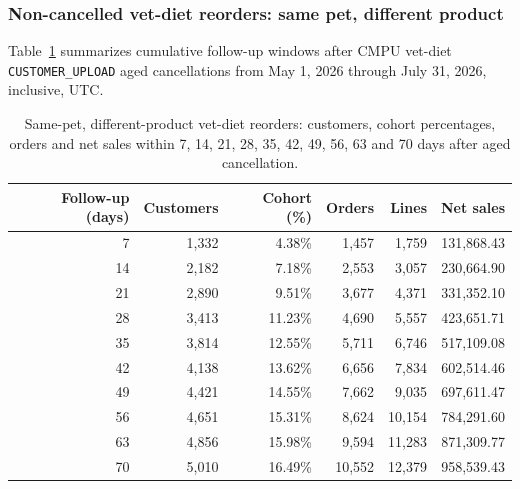 \clearpage
\subsubsection{Non-cancelled vet-diet reorders: same pet, different product}
Table~\ref{tab:financial-opportunity-reorder-same-pet-different-part} summarizes cumulative
follow-up windows after CMPU vet-diet \texttt{CUSTOMER\_UPLOAD} aged cancellations
from May 1, 2026 through July 31, 2026, inclusive, UTC.

\begin{table}[!htbp]
\centering
\caption{Same-pet, different-product vet-diet reorders: customers, cohort percentages, orders and net sales within 7, 14, 21, 28, 35, 42, 49, 56, 63 and 70 days after aged cancellation.}
\label{tab:financial-opportunity-reorder-same-pet-different-part}
\begin{tabular}{@{}rrrrrr@{}}
\toprule
Follow-up (days) & Customers & Cohort (\%) & Orders & Lines & Net sales \\
\midrule
7 & 1,332 & 4.38\% & 1,457 & 1,759 & 131,868.43 \\
14 & 2,182 & 7.18\% & 2,553 & 3,057 & 230,664.90 \\
21 & 2,890 & 9.51\% & 3,677 & 4,371 & 331,352.10 \\
28 & 3,413 & 11.23\% & 4,690 & 5,557 & 423,651.71 \\
35 & 3,814 & 12.55\% & 5,711 & 6,746 & 517,109.08 \\
42 & 4,138 & 13.62\% & 6,656 & 7,834 & 602,514.46 \\
49 & 4,421 & 14.55\% & 7,662 & 9,035 & 697,611.47 \\
56 & 4,651 & 15.31\% & 8,624 & 10,154 & 784,291.60 \\
63 & 4,856 & 15.98\% & 9,594 & 11,283 & 871,309.77 \\
70 & 5,010 & 16.49\% & 10,552 & 12,379 & 958,539.43 \\
\bottomrule
\end{tabular}


\end{table}
